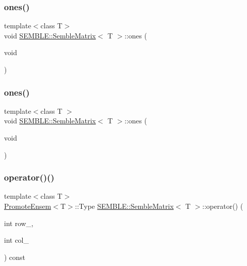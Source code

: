 \mbox{\label{structSEMBLE_1_1SembleMatrix_aef0a3843776f6b716f466616c10b1cd2}} 
\subsubsection{\texorpdfstring{ones()}{ones()}\hspace{0.1cm}{\footnotesize\ttfamily [1/2]}}
{\footnotesize\ttfamily template$<$class T$>$ \\
void \mbox{\hyperlink{structSEMBLE_1_1SembleMatrix}{S\+E\+M\+B\+L\+E\+::\+Semble\+Matrix}}$<$ T $>$\+::ones (\begin{DoxyParamCaption}\item[{void}]{ }\end{DoxyParamCaption})}

\mbox{\label{structSEMBLE_1_1SembleMatrix_aef0a3843776f6b716f466616c10b1cd2}} 
\subsubsection{\texorpdfstring{ones()}{ones()}\hspace{0.1cm}{\footnotesize\ttfamily [2/2]}}
{\footnotesize\ttfamily template$<$class T $>$ \\
void \mbox{\hyperlink{structSEMBLE_1_1SembleMatrix}{S\+E\+M\+B\+L\+E\+::\+Semble\+Matrix}}$<$ T $>$\+::ones (\begin{DoxyParamCaption}\item[{void}]{ }\end{DoxyParamCaption})}

\mbox{\label{structSEMBLE_1_1SembleMatrix_ac971ccfb246830b41dc70f8003281cae}} 
\subsubsection{\texorpdfstring{operator()()}{operator()()}\hspace{0.1cm}{\footnotesize\ttfamily [1/4]}}
{\footnotesize\ttfamily template$<$class T$>$ \\
\mbox{\hyperlink{structSEMBLE_1_1PromoteEnsem}{Promote\+Ensem}}$<$T$>$\+::Type \mbox{\hyperlink{structSEMBLE_1_1SembleMatrix}{S\+E\+M\+B\+L\+E\+::\+Semble\+Matrix}}$<$ T $>$\+::operator() (\begin{DoxyParamCaption}\item[{int}]{row\+\_\+,  }\item[{int}]{col\+\_\+ }\end{DoxyParamCaption}) const\hspace{0.3cm}{\ttfamily [inline]}}

